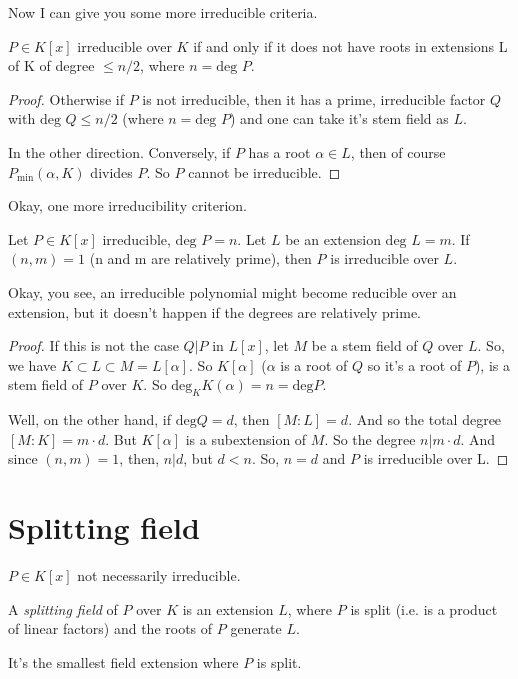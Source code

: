 Now I can give you some more irreducible criteria.
\begin{corollary}
$P\in K[x]$ irreducible over $K$ if and only if it does not have roots in extensions L of K of degree $\leq n/2$, where $n=\text{deg }P$.
\end{corollary}

\begin{proof}
Otherwise if $P$ is not irreducible, then it has a prime, irreducible factor $Q$  with $\text{deg }Q\leq n/2$ (where $n=\text{deg }P$) and one can take it's stem field as $L$.

In the other direction. Conversely, if $P$ has a root $\alpha \in L$, then of course $P_{\text{min}}(\alpha,K)$ divides $P$. So $P$ cannot be irreducible. 
\end{proof}

Okay, one more irreducibility criterion. 
\begin{corollary}
Let $P\in K[x]$ irreducible, $\text{deg }P=n$. Let $L$ be an extension $\text{deg }L=m$. If $(n,m)=1$ (n and m are relatively prime), then $P$ is irreducible over $L$.
\end{corollary}

Okay, you see, an irreducible polynomial might become reducible over an extension, but it doesn't happen if the degrees are relatively prime. 

\begin{proof}
If this is not the case $Q | P$ in $L[x]$, let $M$ be a stem field of $Q$ over $L$. So, we have $K\subset L\subset M=L[\alpha]$. So $K[\alpha]$ ($\alpha$ is a root of $Q$ so it's a root of $P$), is a stem field of $P$ over $K$. So $\text{deg}_KK(\alpha)=n=\text{deg}P$. 

Well, on the other hand, if $\text{deg}Q=d$, then $[M:L]=d$. And so the total degree $[M:K]=m\cdot d$. But $K[\alpha]$ is a subextension of $M$. So the degree $n|m\cdot d$. And since $(n,m)=1$, then, $n | d$, but $d<n$. So, $n = d$ and $P$ is irreducible over L. 
\end{proof}


\section{Splitting field}
$P\in K[x]$ not necessarily irreducible. 
\begin{definition}
A \textit{splitting field} of $P$ over $K$ is an extension $L$, where $P$ is split (i.e. is a product of linear factors) and the roots of $P$ generate $L$. 
\end{definition}
It's the smallest field extension where $P$ is split. 

